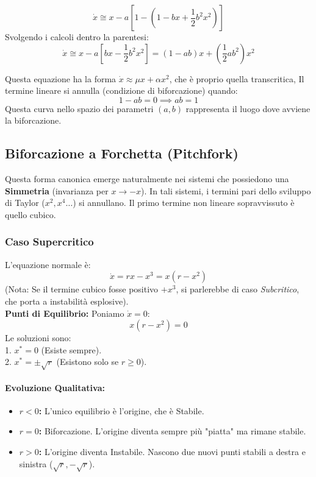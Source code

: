 \documentclass[openany]{book}
\theoremstyle{definition}
\theoremstyle{remark}
\begin{document}
\[ \dot{x} \cong x - a \left[ 1 - \left( 1 - bx + \frac{1}{2}b^2x^2 \right) \right] \]
Svolgendo i calcoli dentro la parentesi:
\[ \dot{x} \cong x - a \left[ bx - \frac{1}{2}b^2x^2 \right] = (1 - ab)x + \left( \frac{1}{2}ab^2 \right)x^2 \]

Questa equazione ha la forma $\dot{x} \approx \mu x + \alpha x^2$, che è proprio quella transcritica,
Il termine lineare si annulla (condizione di biforcazione) quando:
\[ 1 - ab = 0 \implies \boxed{ab = 1} \]
Questa curva nello spazio dei parametri $(a,b)$ rappresenta il luogo dove avviene la biforcazione.

\subsection{Biforcazione a Forchetta (Pitchfork)}
Questa forma canonica emerge naturalmente nei sistemi che possiedono una \textbf{Simmetria } (invarianza per $x \to -x$). In tali sistemi, i termini pari dello sviluppo di Taylor ($x^2, x^4 \dots$) si annullano. Il primo termine non lineare sopravvissuto è quello cubico.

\subsubsection*{Caso Supercritico}
L'equazione normale è:
\begin{equation}
    \dot{x} = rx - x^3 = x(r - x^2)
\end{equation}
(Nota: Se il termine cubico fosse positivo $+x^3$, si parlerebbe di caso \textit{Subcritico}, che porta a instabilità esplosive).
\\
\textbf{Punti di Equilibrio:}
Poniamo $\dot{x} = 0$:
\[ x(r - x^2) = 0 \]
Le soluzioni sono:\\
1. $x^* = 0$ (Esiste sempre).\\
2. $x^* = \pm \sqrt{r}$ (Esistono solo se $r \ge 0$).

\paragraph{Evoluzione Qualitativa:}
\begin{itemize}
    \item \textbf{$r < 0$:} L'unico equilibrio è l'origine, che è Stabile.
    \item \textbf{$r = 0$:} Biforcazione. L'origine diventa sempre più "piatta" ma rimane stabile.
    \item \textbf{$r > 0$:} L'origine diventa Instabile. Nascono due nuovi punti stabili a destra e sinistra ($\sqrt{r}, -\sqrt{r}$).
\end{itemize}
\end{document}
